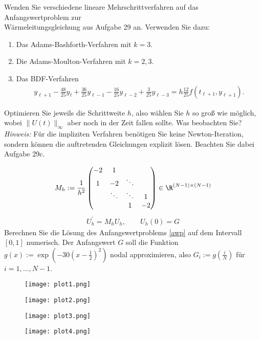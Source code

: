 \begin{exercise}
Wenden Sie verschiedene lineare Mehrschrittverfahren auf das Anfangswertproblem zur\\
Wärmeleitungsgleichung aus Aufgabe 29 an. Verwenden Sie dazu:
\begin{enumerate}[label = \textbf{\alph*)}]
  \item Das Adams-Bashforth-Verfahren mit $k = 3$.
  \item Die Adams-Moulton-Verfahren mit $k = 2,3$.
  \item Das BDF-Verfahren
  \begin{align*}
    y_{\ell + 1} - \frac{48}{25}y_{\ell} + \frac{36}{25}y_{\ell - 1} - \frac{16}{25}y_{\ell - 2}
    + \frac{3}{25}y_{\ell - 3} = h\frac{12}{25}f(t_{\ell + 1},y_{\ell + 1}).
  \end{align*}
\end{enumerate}
Optimieren Sie jeweils die Schrittweite $h$, also wählen Sie $h$ so groß wie möglich,
wobei $\|U(t)\|_{\infty}$ aber noch in der Zeit fallen sollte. Was beobachten Sie? \\
\textit{Hinweis:} Für die impliziten Verfahren benötigen Sie keine Newton-Iteration,
sondern können die auftretenden Gleichungen explizit lösen. Beachten Sie dabei Aufgabe 29c.
\end{exercise}
\begin{solution}
\begin{align}
  M_h := \frac{1}{h^2}\begin{pmatrix}
    -2 & 1 & &  \\
    1 & -2 & \ddots & \\
    & \ddots & \ddots & 1 \\
    & & 1 & -2
  \end{pmatrix}
  \in \R^{(N-1)\times (N-1)}
\end{align}
\begin{align}\label{awp}
  U_h^{\prime} = M_hU_h, \qquad U_h(0) = G
\end{align}
Berechnen Sie die Lösung des Anfangswertproblems \eqref{awp} auf dem Intervall
$[0,1]$ numerisch. Der Anfangswert $G$ soll die Funktion
$g(x) := \exp\left(-30\left(x-\frac{1}{2}\right)^2\right)$ nodal approximieren, also
$G_i := g\left(\frac{i}{N}\right)$ für $i = 1,\dots,N-1$.
\begin{figure}
    \centering
    \texttt{[image: plot1.png]}
\end{figure}
\begin{figure}
    \centering
    \texttt{[image: plot2.png]}
\end{figure}
\begin{figure}
    \centering
    \texttt{[image: plot3.png]}
\end{figure}
\begin{figure}
    \centering
    \texttt{[image: plot4.png]}
\end{figure}
\end{solution}
